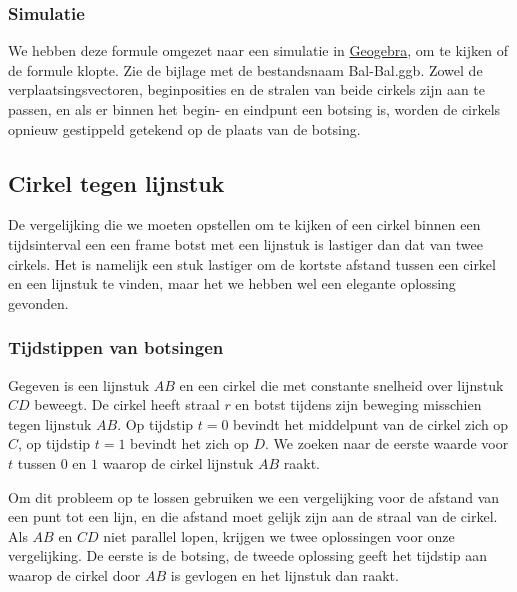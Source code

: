 \documentclass[12pt,a4paper]{article}
\begin{document}
	\subsubsection{Simulatie}
	We hebben deze formule omgezet naar een simulatie in \href{http://www.geogebra.org/webstart/geogebra.html}{Geogebra}, om te kijken of de formule klopte. Zie de bijlage met de bestandsnaam Bal-Bal.ggb. Zowel de verplaatsingsvectoren, beginposities en de stralen van beide cirkels zijn aan te passen, en als er binnen het begin- en eindpunt een botsing is, worden de cirkels opnieuw gestippeld getekend op de plaats van de botsing.
	
	\subsection{Cirkel tegen lijnstuk}
	De vergelijking die we moeten opstellen om te kijken of een cirkel binnen een tijdsinterval een een frame botst met een lijnstuk is lastiger dan dat van twee cirkels. Het is namelijk een stuk lastiger om de kortste afstand tussen een cirkel en een lijnstuk te vinden, maar het we hebben wel een elegante oplossing gevonden.
	
	\subsubsection{Tijdstippen van botsingen}
	Gegeven is een lijnstuk $AB$ en een cirkel die met constante snelheid over lijnstuk $CD$ beweegt. De cirkel heeft straal $r$ en botst tijdens zijn beweging misschien tegen lijnstuk $AB$. Op tijdstip $t=0$ bevindt het middelpunt van de cirkel zich op $C$, op tijdstip $t=1$ bevindt het zich op $D$. We zoeken naar de eerste waarde voor $t$ tussen $0$ en $1$ waarop de cirkel lijnstuk $AB$ raakt.
	
	Om dit probleem op te lossen gebruiken we een vergelijking voor de afstand van een punt tot een lijn, en die afstand moet gelijk zijn aan de straal van de cirkel. Als $AB$ en $CD$ niet parallel lopen, krijgen we twee oplossingen voor onze vergelijking. De eerste is de botsing, de tweede oplossing geeft het tijdstip aan waarop de cirkel door $AB$ is gevlogen en het lijnstuk dan raakt.
	
\end{document}
